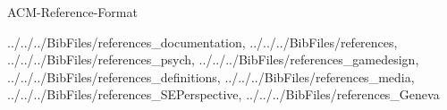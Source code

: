 \documentclass[11pt, titlepage]{article}
\begin{document}
    \clearpage

    

    \clearpage

    

    \clearpage

    

    \clearpage

    

    \clearpage

    

    \clearpage

    

    \clearpage

     {ACM-Reference-Format}
    
    {../../../BibFiles/references_documentation, ../../../BibFiles/references,
    ../../../BibFiles/references_psych,
    ../../../BibFiles/references_gamedesign,
    ../../../BibFiles/references_definitions,
     ../../../BibFiles/references_media,
    ../../../BibFiles/references_SEPerspective,
    ../../../BibFiles/references_Geneva}

    \clearpage

    \begin{appendix}

        

        \clearpage

        

    \end{appendix}
\end{document}
